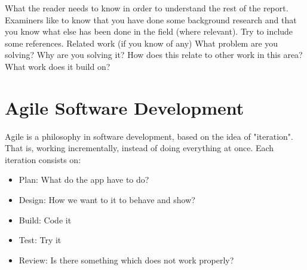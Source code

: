 
What the reader needs to know in order to understand the rest of the report. Examiners like to know that you have done some background research and that you know what else has been done in the field (where relevant). Try to include some references.
    Related work (if you know of any)
    What problem are you solving?
    Why are you solving it?
    How does this relate to other work in this area?
    What work does it build on?
    
\section{Agile Software Development}

Agile is a philosophy in software development, based on the idea of "iteration". That is, working incrementally, instead of doing everything at once. Each iteration consists on:
\begin{itemize}
\setlength{\itemsep}{-5pt}
\item Plan: What do the app have to do?
\item Design: How we want to it to behave and show?
\item Build: Code it
\item Test: Try it
\item Review: Is there something which does not work properly?
\end{itemize}

